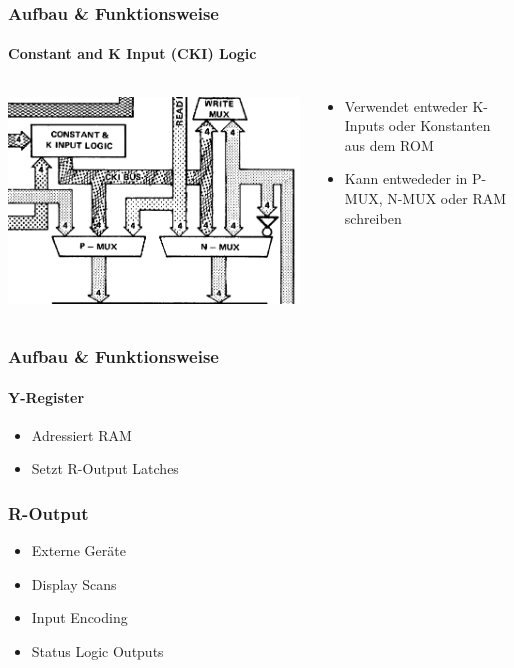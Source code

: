 \begin{frame}
\frametitle{Aufbau \& Funktionsweise}
	\framesubtitle{Constant and K Input (CKI) Logic}
		\begin{columns}
			\begin{column}{5cm}
				\includegraphics[scale=0.3]{images/CKI.PNG}
			\end{column}
		\begin{column}{5cm}
			\begin{itemize}
				\item Verwendet entweder K-Inputs oder Konstanten aus dem ROM \pause
				\item Kann entwededer in P-MUX, N-MUX oder RAM schreiben
			\end{itemize}
		\end{column}
	\end{columns}
\end{frame}


\begin{frame}
\frametitle{Aufbau \& Funktionsweise}
	\framesubtitle{Y-Register}
		\begin{itemize}
			\item Adressiert RAM \pause
			\item Setzt R-Output Latches
		\end{itemize}
\end{frame}


\begin{frame}
	\frametitle{R-Output}
		\begin{itemize}
			\item Externe Ger{\"a}te \pause
			\item	Display Scans \pause
			\item Input Encoding \pause
			\item Status Logic Outputs
		\end{itemize}
\end{frame}


